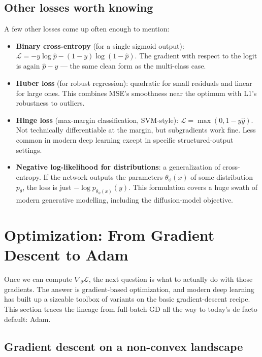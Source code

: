 \documentclass[11pt, a4paper]{article}
\let\oldsection\section
\renewcommand{\section}{\clearpage\oldsection}
\newcommand{\Loss}{\mathcal{L}}
\begin{document}
\subsection{Other losses worth knowing}

A few other losses come up often enough to mention:

\begin{itemize}[leftmargin=*]
    \item \textbf{Binary cross-entropy} (for a single sigmoid output): $\Loss = -y \log \hat p - (1-y)\log(1-\hat p)$. The gradient with respect to the logit is again $\hat p - y$ --- the same clean form as the multi-class case.
    \item \textbf{Huber loss} (for robust regression): quadratic for small residuals and linear for large ones. This combines MSE's smoothness near the optimum with L1's robustness to outliers.
    \item \textbf{Hinge loss} (max-margin classification, SVM-style): $\Loss = \max(0, 1 - y\hat y)$. Not technically differentiable at the margin, but subgradients work fine. Less common in modern deep learning except in specific structured-output settings.
    \item \textbf{Negative log-likelihood for distributions}: a generalization of cross-entropy. If the network outputs the parameters $\theta_\phi(x)$ of some distribution $p_\theta$, the loss is just $-\log p_{\theta_\phi(x)}(y)$. This formulation covers a huge swath of modern generative modelling, including the diffusion-model objective.
\end{itemize}

\section{Optimization: From Gradient Descent to Adam}
\label{sec:optim}

Once we can compute $\nabla_\theta \Loss$, the next question is what to actually do with those gradients. The answer is gradient-based optimization, and modern deep learning has built up a sizeable toolbox of variants on the basic gradient-descent recipe. This section traces the lineage from full-batch GD all the way to today's de facto default: Adam.

\subsection{Gradient descent on a non-convex landscape}
\end{document}
